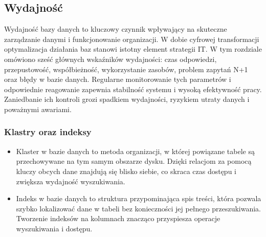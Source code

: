 \documentclass[a4paper,11pt,openany,english]{sphinxmanual}
\begin{document}
\subsection{Wydajność}
\label{\detokenize{rozdzial2/Wydajnosc-Skalowanie-i-Replikacja/index:wydajnosc}}
\sphinxAtStartPar
Wydajność bazy danych to kluczowy czynnik wpływający na skuteczne zarządzanie danymi i funkcjonowanie organizacji. W dobie cyfrowej transformacji optymalizacja działania baz stanowi istotny element strategii IT. W tym rozdziale omówiono sześć głównych wskaźników wydajności: czas odpowiedzi, przepustowość, współbieżność, wykorzystanie zasobów, problem zapytań N+1 oraz błędy w bazie danych. Regularne monitorowanie tych parametrów i odpowiednie reagowanie zapewnia stabilność systemu i wysoką efektywność pracy. Zaniedbanie ich kontroli grozi spadkiem wydajności, ryzykiem utraty danych i poważnymi awariami.


\subsubsection{Klastry oraz indeksy}
\label{\detokenize{rozdzial2/Wydajnosc-Skalowanie-i-Replikacja/index:klastry-oraz-indeksy}}\begin{itemize}
\item {} 
\sphinxAtStartPar
Klaster w bazie danych to metoda organizacji, w której powiązane tabele są przechowywane na tym samym obszarze dysku. Dzięki relacjom za pomocą kluczy obcych dane znajdują się blisko siebie, co skraca czas dostępu i zwiększa wydajność wyszukiwania.

\item {} 
\sphinxAtStartPar
Indeks w bazie danych to struktura przypominająca spis treści, która pozwala szybko lokalizować dane w tabeli bez konieczności jej pełnego przeszukiwania. Tworzenie indeksów na kolumnach znacząco przyspiesza operacje wyszukiwania i dostępu.

\end{itemize}
\end{document}
